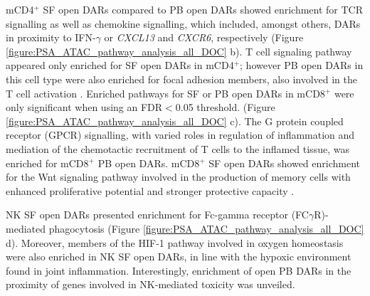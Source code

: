 mCD4$^+$ SF open DARs compared to PB open DARs showed enrichment for TCR signalling as well as chemokine signalling, which included, amongst others, DARs in proximity to IFN-$\gamma$ or \textit{CXCL13} and \textit{CXCR6}, respectively (Figure \ref{figure:PSA_ATAC_pathway_analysis_all_DOC} b). T cell signaling pathway appeared only enriched for SF open DARs in mCD4$^+$; however PB open DARs in this cell type were also enriched for focal adhesion members, also involved in the T cell activation \parencite{Dustin2001}. Enriched pathways for SF or PB open DARs in mCD8$^+$ were only significant when using an FDR$<$0.05 threshold. (Figure \ref{figure:PSA_ATAC_pathway_analysis_all_DOC} c). The G protein coupled receptor (GPCR) signalling, with varied roles in regulation of inflammation and mediation of the chemotactic recruitment of T cells to the inflamed tissue, was enriched for mCD8$^+$ PB open DARs. mCD8$^+$ SF open DARs showed enrichment for the Wnt signaling pathway involved in the production of memory cells with enhanced proliferative potential and stronger protective capacity \parencite{Boudousquie2014,}. 

NK SF open DARs presented enrichment for Fc-gamma receptor (FC$\gamma$R)-mediated phagocytosis (Figure \ref{figure:PSA_ATAC_pathway_analysis_all_DOC} d). Moreover, members of the HIF-1 pathway involved in oxygen homeostasis were also enriched in NK SF open DARs, in line with the hypoxic environment found in joint inflammation. Interestingly, enrichment of open PB DARs in the proximity of genes involved in NK-mediated toxicity was unveiled. 


